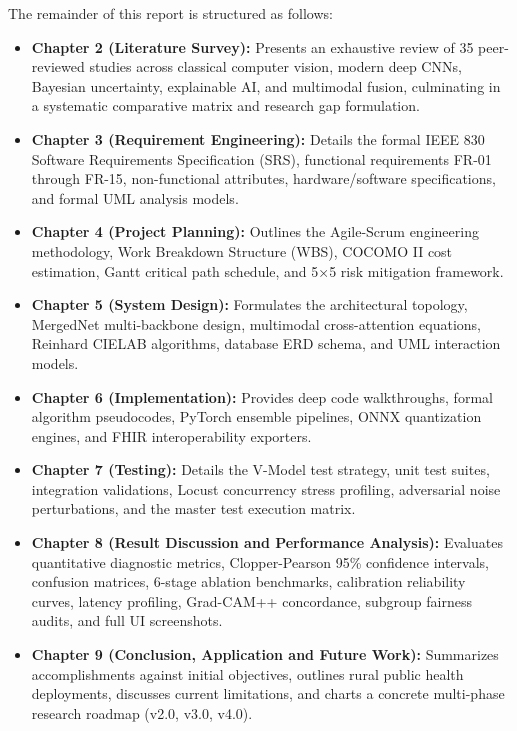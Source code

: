 \documentclass[12pt,a4paper,oneside]{report}
\begin{document}
The remainder of this report is structured as follows:
\begin{itemize}
    \item \textbf{Chapter 2 (Literature Survey):} Presents an exhaustive review of 35 peer-reviewed studies across classical computer vision, modern deep CNNs, Bayesian uncertainty, explainable AI, and multimodal fusion, culminating in a systematic comparative matrix and research gap formulation.
    \item \textbf{Chapter 3 (Requirement Engineering):} Details the formal IEEE 830 Software Requirements Specification (SRS), functional requirements FR-01 through FR-15, non-functional attributes, hardware/software specifications, and formal UML analysis models.
    \item \textbf{Chapter 4 (Project Planning):} Outlines the Agile-Scrum engineering methodology, Work Breakdown Structure (WBS), COCOMO II cost estimation, Gantt critical path schedule, and 5×5 risk mitigation framework.
    \item \textbf{Chapter 5 (System Design):} Formulates the architectural topology, MergedNet multi-backbone design, multimodal cross-attention equations, Reinhard CIELAB algorithms, database ERD schema, and UML interaction models.
    \item \textbf{Chapter 6 (Implementation):} Provides deep code walkthroughs, formal algorithm pseudocodes, PyTorch ensemble pipelines, ONNX quantization engines, and FHIR interoperability exporters.
    \item \textbf{Chapter 7 (Testing):} Details the V-Model test strategy, unit test suites, integration validations, Locust concurrency stress profiling, adversarial noise perturbations, and the master test execution matrix.
    \item \textbf{Chapter 8 (Result Discussion and Performance Analysis):} Evaluates quantitative diagnostic metrics, Clopper-Pearson 95\% confidence intervals, confusion matrices, 6-stage ablation benchmarks, calibration reliability curves, latency profiling, Grad-CAM++ concordance, subgroup fairness audits, and full UI screenshots.
    \item \textbf{Chapter 9 (Conclusion, Application and Future Work):} Summarizes accomplishments against initial objectives, outlines rural public health deployments, discusses current limitations, and charts a concrete multi-phase research roadmap (v2.0, v3.0, v4.0).
\end{itemize}
\end{document}
